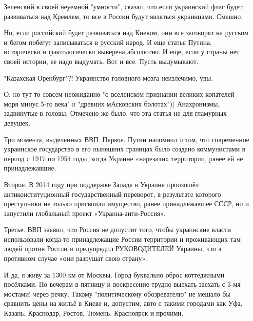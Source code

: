 \begin{itemize}
Зеленский в своей неуемной "умности", сказал, что если украинский флаг будет
развиваться над Кремлем, то все в России будут являться украинцами. Смешно. 

Но, если российский будет развиваться над Киевом, они все заговорят на русском
и бегом побегут записываться в русский народ. И еще статья Путина, исторически
и фактологически выверена абсолютно. И еще, если у страны нет своей истории, ее
надо выдумать. Вот и все. Пусть выдумывают.

 
"Казахская Оренбург"?! Украинство головного мозга неизлечимо, увы.

 

О, но тут-то совсем неожиданно "о вселенском признании великих копателей моря
минус 5-го века" и "древних мАсковских болотах")) Анахронизмы, задвинутые в
головы. Отмечено же было, что эта статья не для гламурных девушек.

Три момента, выделенных ВВП. Первое. Путин напомнил о том, что современное
украинское государство в его нынешних границах было создано коммунистами в
период с 1917 по 1954 годы, когда Украине «нарезали» территории, ранее ей не
принадлежавшие.

Второе. В 2014 году при поддержке Запада в Украине произошёл
антиконституционный государственный переворот, в результате которого
преступники не только присвоили имущество, ранее принадлежавшее СССР, но и
запустили глобальный проект «Украина-анти-Россия».

Третье. ВВП заявил, что Россия не допустит того, чтобы украинские власти
использовали когда-то принадлежащие России территории и проживающих там людей
против России и предупредил РУКОВОДИТЕЛЕЙ Украины, что в противном случае «они
разрушат свою страну».

И да, я живу за 1300 км от Москвы. Город буквально оброс коттеджными посёлками.
По вечерам в пятницу и воскресение трудно выехать-заехать с 3-мя мостами! через
речку. Такому "политическому обозревателю" не мешало бы сравнить цены на жильё
в Киеве и, допустим, авто с такими городами как Уфа, Казань, Краснодар, Ростов,
Тюмень, Красноярск и прочими.


\end{itemize}

